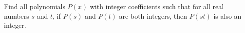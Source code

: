 Find all polynomials $P(x)$ with integer coefficients such that for all real numbers $s$ and $t$, if $P(s)$ and $P(t)$ are both integers, then $P(st)$ is also an integer.